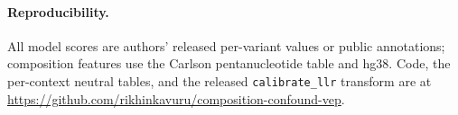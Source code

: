 \documentclass[pmlr]{jmlr}
\begin{document}
\paragraph{Reproducibility.} All model scores are authors' released per-variant values or
public annotations; composition features use the Carlson pentanucleotide table and hg38. Code,
the per-context neutral tables, and the released \texttt{calibrate\_llr} transform are at
\url{https://github.com/rikhinkavuru/composition-confound-vep}.



\end{document}
